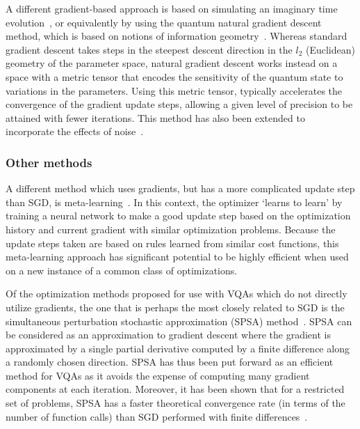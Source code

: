 \documentclass[prx,twocolumn,floatfix,superscriptaddress,longbibliography]{revtex4-1}
\newcommand{\<}{\langle}
\renewcommand{\>}{\rangle}
\begin{document}
A different gradient-based approach is based on simulating an imaginary time evolution~\cite{mcardle2019variational}, or equivalently by using the quantum natural gradient descent method, which is based on notions of information geometry~\cite{stokes2019quantum,koczor2019quantum}. Whereas standard gradient descent takes steps in the steepest descent direction in the $l_2$ (Euclidean) geometry of the parameter space, natural gradient descent works instead on a space with a metric tensor that encodes the sensitivity of the quantum state to variations in the parameters. Using this metric tensor, typically accelerates the convergence of the gradient update steps, allowing a given level of precision to be attained with fewer iterations. This method has also been extended to incorporate the effects of noise~\cite{koczor2019quantum}.

\subsubsection{Other methods} A different method which uses gradients, but has a more complicated update step than SGD, is meta-learning~\cite{wilson2019optimizing}. In this context, the optimizer `learns to learn' by training a neural network to make a good update step based on the optimization history and current gradient with similar optimization problems. Because the update steps taken are based on rules learned from similar cost functions, this meta-learning approach has significant potential to be highly efficient when used on a new instance of a common class of optimizations.
    
Of the optimization methods proposed for use with VQAs which do not directly utilize gradients, the one that is perhaps the most closely related to SGD is the simultaneous perturbation stochastic approximation (SPSA) method~\cite{spall1992}. SPSA can be considered as an approximation to gradient descent where the gradient is approximated by a single partial derivative computed by a finite difference along a randomly chosen direction. SPSA has thus been put forward as an efficient method for VQAs as it avoids the expense of computing many gradient components at each iteration. Moreover, it has been shown that for a restricted set of problems,  SPSA has a faster theoretical convergence rate (in terms of the number of function calls) than SGD performed with finite differences~\cite{spall1992}.
    
\end{document}
